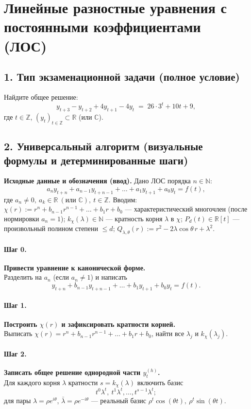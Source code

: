 \section{Линейные разностные уравнения с постоянными коэффициентами (ЛОС)}

\subsection*{1. Тип экзаменационной задачи (полное условие)}
Найдите общее решение:
\[
y_{t+3}-y_{t+2}+4y_{t+1}-4y_{t} \;=\; 26\cdot 3^{t} + 10t + 9,
\]
где \(t\in\mathbb Z\), \((y_t)_{t\in\mathbb Z}\subset\mathbb R\) (или \(\mathbb C\)).

\subsection*{2. Универсальный алгоритм (визуальные формулы и детерминированные шаги)}

\textbf{Исходные данные и обозначения (ввод).} Дано ЛОС порядка \(n\in\mathbb N\):
\[
a_n y_{t+n} + a_{n-1} y_{t+n-1} + \dots + a_1 y_{t+1} + a_0 y_t = f(t),
\]
где \(a_n\neq 0,\ a_k\in\mathbb R\ (\text{или }\mathbb C),\ t\in\mathbb Z\).
Вводим: \(\chi(r):=r^n+b_{n-1}r^{n-1}+\dots+b_1 r + b_0\) — характеристический многочлен (после нормировки \(a_n=1\));
\(k_\chi(\lambda)\in\mathbb N\) — кратность корня \(\lambda\) в \(\chi\);
\(P_d(t)\in\mathbb R[t]\) — произвольный полином степени \(\le d\);
\(Q_{\lambda,\theta}(r):=r^2-2\lambda\cos\theta\,r+\lambda^2\).

\paragraph{Шаг 0.} \textbf{Привести уравнение к канонической форме.}\\
Разделить на \(a_n\) (если \(a_n\neq 1\)) и написать
\[
y_{t+n} + b_{n-1} y_{t+n-1} + \dots + b_1 y_{t+1} + b_0 y_t = f(t).
\]

\paragraph{Шаг 1.} \textbf{Построить \(\chi(r)\) и зафиксировать кратности корней.}\\
Выписать \(\chi(r)=r^{n}+b_{n-1}r^{n-1}+\dots+b_1 r + b_0\), найти все \(\lambda_j\) и \(k_\chi(\lambda_j)\).

\paragraph{Шаг 2.} \textbf{Записать общее решение однородной части \(y^{(h)}_t\).}\\
Для каждого корня \(\lambda\) кратности \(s=k_\chi(\lambda)\) включить базис
\[
t^0\lambda^{t},\ t^1\lambda^{t},\dots,t^{s-1}\lambda^{t};
\]
для пары \(\lambda=\rho e^{i\theta}\), \(\bar\lambda=\rho e^{-i\theta}\) — реальный базис \(\rho^{t}\cos(\theta t),\ \rho^{t}\sin(\theta t)\).

